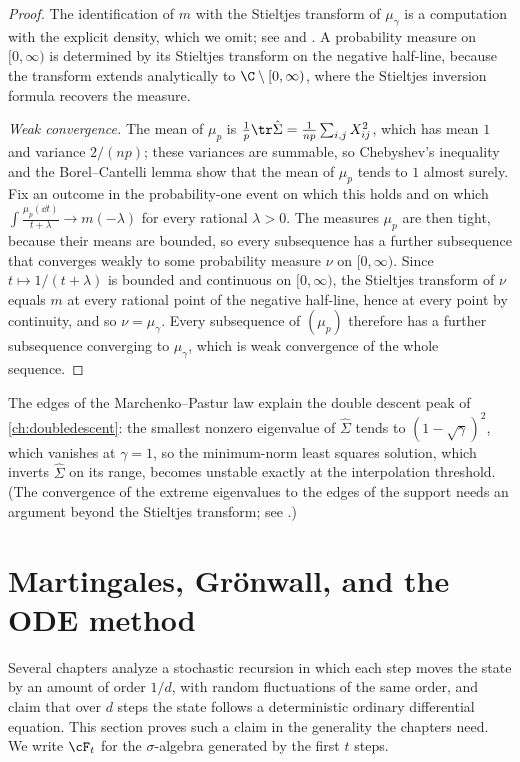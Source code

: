 \begin{refsection}
\begin{proof}
The identification of $m$ with the Stieltjes transform of $\mu_\gamma$ is a computation with the explicit density, which we omit; see \textcite{MarchenkoPastur1967} and \textcite[Chapter~3]{BaiSilverstein2010}. A probability measure on $[0,\infty)$ is determined by its Stieltjes transform on the negative half-line, because the transform extends analytically to $\C\setminus[0,\infty)$, where the Stieltjes inversion formula recovers the measure.

\emph{Weak convergence.} The mean of $\mu_p$ is $\frac1p\tr\hat\Sigma=\frac1{np}\sum_{i,j}X_{ij}^2$, which has mean $1$ and variance $2/(np)$; these variances are summable, so Chebyshev's inequality and the Borel--Cantelli lemma show that the mean of $\mu_p$ tends to $1$ almost surely. Fix an outcome in the probability-one event on which this holds and on which $\int\frac{\mu_p(\dd t)}{t+\lambda}\to m(-\lambda)$ for every rational $\lambda>0$. The measures $\mu_p$ are then tight, because their means are bounded, so every subsequence has a further subsequence that converges weakly to some probability measure $\nu$ on $[0,\infty)$. Since $t\mapsto1/(t+\lambda)$ is bounded and continuous on $[0,\infty)$, the Stieltjes transform of $\nu$ equals $m$ at every rational point of the negative half-line, hence at every point by continuity, and so $\nu=\mu_\gamma$. Every subsequence of $(\mu_p)$ therefore has a further subsequence converging to $\mu_\gamma$, which is weak convergence of the whole sequence.
\end{proof}

\begin{remark}\label{rem:toolkit:mp-edges}
The edges of the Marchenko--Pastur law explain the double descent peak of \cref{ch:doubledescent}: the smallest nonzero eigenvalue of $\hat\Sigma$ tends to $(1-\sqrt\gamma)^2$, which vanishes at $\gamma=1$, so the minimum-norm least squares solution, which inverts $\hat\Sigma$ on its range, becomes unstable exactly at the interpolation threshold. (The convergence of the extreme eigenvalues to the edges of the support needs an argument beyond the Stieltjes transform; see \textcite[Chapter~5]{BaiSilverstein2010}.)
\end{remark}

\section{Martingales, Gr\"onwall, and the ODE method}\label{sec:toolkit:ode}

Several chapters analyze a stochastic recursion in which each step moves the state by an amount of order $1/d$, with random fluctuations of the same order, and claim that over $d$ steps the state follows a deterministic ordinary differential equation. This section proves such a claim in the generality the chapters need. We write $\cF_t$ for the $\sigma$-algebra generated by the first $t$ steps.


\end{refsection}
